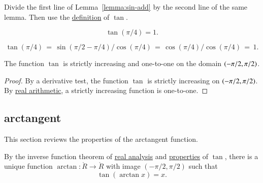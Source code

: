 \begin{proved}
  Divide the first line of Lemma~\ref{lemma:sin-add} by the second
  line of the same lemma.  Then use the \hyperref[def:tan]{definition}
  of $\tan$.  \swallowed\end{proved}

\begin{lemma}[]\label{lemma:tan-pi4}
\begin{displaymath}\tan(\pi/4) = 1.\end{displaymath}
\end{lemma}

\begin{proved}  
\begin{displaymath}
\tan(\pi/4) \hyperref[def:tan]{\,=\,} \sin(\pi/2-\pi/4)/\cos(\pi/4) 
  \hyperref[lemma:cos-sin]{\,=\,}
  \cos(\pi/4)/\cos(\pi/4) \hyperref[eqn:cospi2]{\,=\,} 1.
\end{displaymath}
\swallowed\end{proved}

\begin{lemma}[]\label{lemma:tan-monotone}
The function $\tan$ is strictly increasing and one-to-one on the domain
$(-\pi/2,\pi/2)$.
\end{lemma}

\begin{proof} By a derivative test, the function $\tan$ is strictly
  increasing on $(-\pi/2,\pi/2)$.  By
  \hyperref[back:analysis]{real arithmetic}, a strictly increasing
  function is one-to-one.
\end{proof}

\subsection{arctangent}

This section reviews the properties of the arctangent function.  

\begin{definition}[arctangent]\label{def:arctan}
  By the inverse function theorem of \hyperref[back:analysis]{real
    analysis} and \hyperref[lemma:tan-monotone]{properties} of $\tan$,
  there is a unique function $\arctan:\ring{R}\to\ring{R}$ with image
  $(-\pi/2,\pi/2)$ such that
\begin{equation}\label{eqn:tanarctan}\tan(\arctan x) =x.\end{equation}
%
\end{definition}

